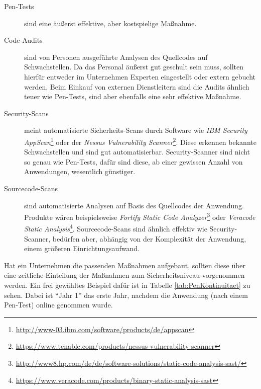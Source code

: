 \begin{description}
	\item[Pen-Tests] sind eine äußerst effektive, aber kostspielige Maßnahme.
	
	\item[Code-Audits] sind von Personen ausgeführte Analysen des Quellcodes auf Schwachstellen. Da das Personal äußerst gut geschult sein muss, sollten hierfür entweder im Unternehmen Experten eingestellt oder extern gebucht werden. Beim Einkauf von externen Dienstleitern sind die Audits ähnlich teuer wie Pen-Tests, sind aber ebenfalls eine sehr effektive Maßnahme.
	
	\item[Security-Scans] meint automatisierte Sicherheits-Scans durch Software wie \textit{IBM Security AppScan}\footnote{\url{http://www-03.ibm.com/software/products/de/appscan}} oder der \textit{Nessus Vulnerability Scanner}\footnote{\url{https://www.tenable.com/products/nessus-vulnerability-scanner}}. Diese erkennen bekannte Schwachstellen und sind gut automatisierbar. Security-Scanner sind nicht so genau wie Pen-Tests, dafür sind diese, ab einer gewissen Anzahl von Anwendungen, wesentlich günstiger.
	
	\item[Sourcecode-Scans] sind automatisierte Analysen auf Basis des Quellcodes der Anwendung. Produkte wären beispielsweise \textit{Fortify Static Code Analyzer}\footnote{\url{http://www8.hp.com/de/de/software-solutions/static-code-analysis-sast/}} oder \textit{Veracode Static Analysis}\footnote{\url{https://www.veracode.com/products/binary-static-analysis-sast}}. Sourcecode-Scans sind ähnlich effektiv wie Security-Scanner, bedürfen aber, abhängig von der Komplexität der Anwendung, einem größeren Einrichtungsaufwand.
	
\end{description}
 
Hat ein Unternehmen die passenden Maßnahmen aufgebaut, sollten diese über eine zeitliche Einteilung der Maßnahmen zum Sicherheitsniveau vorgenommen werden. Ein frei gewähltes Beispiel dafür ist in Tabelle \ref{tab:PenKontinuitaet} zu sehen. Dabei ist "`Jahr 1"' das erste Jahr, nachdem die Anwendung (nach einem Pen-Test) online genommen wurde.


